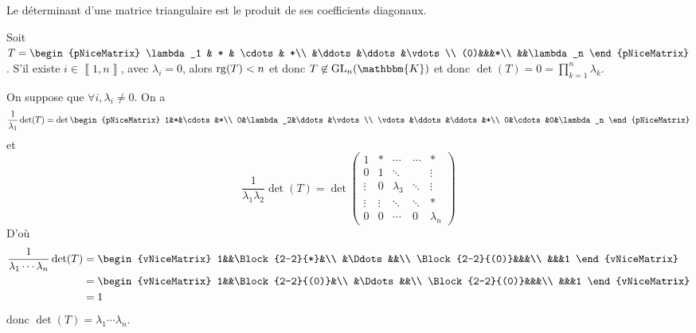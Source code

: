 \begin{crlr}
	Le déterminant d'une matrice triangulaire est le produit de ses coefficients diagonaux.
\end{crlr}

\begin{prv}
	Soit $T = \begin{pNiceMatrix}
		\lambda_1 & * & \cdots & *\\
		&\ddots&\ddots&\vdots\\
		(0)&&&*\\
		&&\lambda_n
	\end{pNiceMatrix}$. S'il existe $i \in \left\llbracket 1,n \right\rrbracket$, avec $\lambda_i = 0$, alors $\operatorname{rg}(T) < n$ et donc $T \not\in \mathrm{GL}_n(\mathbbm{K})$ et donc $\det(T) = 0 = \prod_{k=1}^n \lambda_k$.

	On suppose que $\forall i, \lambda_i \neq 0$. On a \[
		\frac{1}{\lambda_1} \det(T) = \det \begin{pNiceMatrix}
			1&*&\cdots&*\\
			0&\lambda_2&\ddots&\vdots\\
			\vdots&\ddots&\ddots&*\\
			0&\cdots&0&\lambda_n
		\end{pNiceMatrix}
	\] et \[
		\frac{1}{\lambda_1 \lambda_2} \det(T) = \det \begin{pmatrix}
			1&*&\cdots&\cdots&*\\
			0&1&\ddots&&\vdots\\
			\vdots&0&\lambda_3&\ddots&\vdots\\
			\vdots&\vdots&\ddots&\ddots&*\\
			0&0&\cdots&0&\lambda_n
		\end{pmatrix}
	\]
	D'où
	\begin{align*}
		\frac{1}{\lambda_1 \cdots \lambda_n} \det(T) &= \begin{vNiceMatrix}
			1&&\Block{2-2}{*}&\\
			&\Ddots&&\\
			\Block{2-2}{(0)}&&&\\
			&&&1
		\end{vNiceMatrix} \\
		&= \begin{vNiceMatrix}
			1&&\Block{2-2}{(0)}&\\
			&\Ddots&&\\
			\Block{2-2}{(0)}&&&\\
			&&&1
		\end{vNiceMatrix}\\
		&= 1 \\
	\end{align*}
	donc $\det(T) = \lambda_1 \cdots \lambda_n$.
\end{prv}

